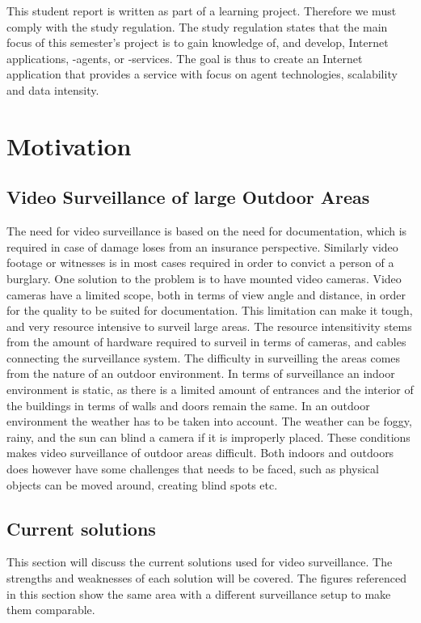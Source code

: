 This student report is written as part of a learning project. Therefore we must comply with the study regulation.
The study regulation states that the main focus of this semester's project is to gain knowledge of, and develop, Internet applications, -agents, or -services.
The goal is thus to create an Internet application that provides a service with focus on agent technologies, scalability and data intensity.

\section{Motivation}

\subsection{Video Surveillance of large Outdoor Areas}
The need for video surveillance is based on the need for documentation, which is required in case of damage loses from an insurance perspective.
Similarly video footage or witnesses is in most cases required in order to convict a person of a burglary.
One solution to the problem is to have mounted video cameras.
Video cameras have a limited scope, both in terms of view angle and distance, in order for the quality to be suited for documentation.
This limitation can make it tough, and very resource intensive to surveil large areas.
The resource intensitivity stems from the amount of hardware required to surveil in terms of cameras, and cables connecting the surveillance system.
The difficulty in surveilling the areas comes from the nature of an outdoor environment.
In terms of surveillance an indoor environment is static, as there is a limited amount of entrances and the interior of the buildings in terms of walls and doors remain the same.
In an outdoor environment the weather has to be taken into account.
The weather can be foggy, rainy, and the sun can blind a camera if it is improperly placed.
These conditions makes video surveillance of outdoor areas difficult.
Both indoors and outdoors does however have some challenges that needs to be faced, such as physical objects can be moved around, creating blind spots etc.

\subsection{Current solutions}
This section will discuss the current solutions used for video surveillance.
The strengths and weaknesses of each solution will be covered.
The figures referenced in this section show the same area with a different surveillance setup to make them comparable.
